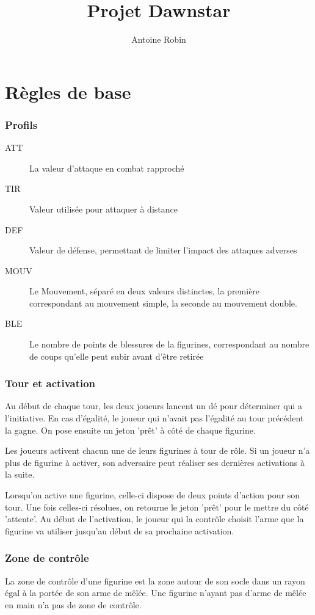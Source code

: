\documentclass[10pt,a4paper]{article}
\author{Antoine Robin}
\title{Projet Dawnstar}
\date{}
\begin{document}
\maketitle
\part{Règles de base}
\begin{multicols}{3}
\section*{Profils}
\begin{description}
\item[ATT]La valeur d'attaque en combat rapproché
\item[TIR]Valeur utilisée pour attaquer à distance
\item[DEF]Valeur de défense, permettant de limiter l'impact des attaques adverses
\item[MOUV]Le Mouvement, séparé en deux valeurs distinctes, la première correspondant au mouvement simple, la seconde au mouvement double.
\item[BLE]Le nombre de points de blessures de la figurines, correspondant au nombre de coups qu'elle peut subir avant d'être retirée

\end{description}
\section*{Tour et activation}
Au début de chaque tour, les deux joueurs lancent un dé pour déterminer qui a l'initiative. En cas d'égalité, le joueur qui n'avait pas l'égalité au tour précédent la gagne. On pose ensuite un jeton 'prêt' à côté de chaque figurine.

Les joueurs activent chacun une de leurs figurines à tour de rôle. Si un joueur n'a plus de figurine à activer, son adversaire peut réaliser ses dernières activations à la suite.

Lorsqu'on active une figurine, celle-ci dispose de deux points d'action pour son tour. Une fois celles-ci résolues, on retourne le jeton 'prêt' pour le mettre du côté 'attente'. Au début de l'activation, le joueur qui la contrôle choisit l'arme que la figurine va utiliser jusqu'au début de sa prochaine activation.
\section*{Zone de contrôle}
La zone de contrôle d'une figurine est la zone autour de son socle dans un rayon égal à la portée de son arme de mêlée. Une figurine n'ayant pas d'arme de mêlée en main n'a pas de zone de contrôle.

\end{multicols}
\end{document}
